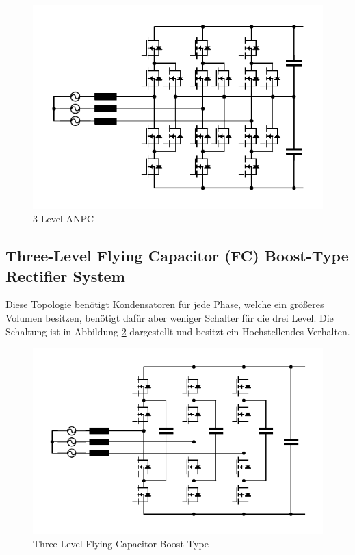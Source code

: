 		\begin{figure}[H]
			\centering
			\includegraphics[width=0.9\linewidth]{content/Grafiken/ANPC}
			\caption{3-Level ANPC}
			\label{fig:anpc}
		\end{figure}
	
	
	\subsection{Three-Level Flying Capacitor (FC) Boost-Type Rectifier System}
		Diese Topologie benötigt Kondensatoren für jede Phase, welche ein größeres Volumen besitzen, benötigt dafür aber weniger Schalter für die drei Level. Die Schaltung ist in Abbildung \ref{fig:3l-fc-boost} dargestellt und besitzt ein Hochstellendes Verhalten.
		\begin{figure}[H]
			\centering
			\includegraphics[width=0.9\linewidth]{content/Grafiken/3L-FC-Boost}
			\caption{Three Level Flying Capacitor Boost-Type}
			\label{fig:3l-fc-boost}
		\end{figure}
	
